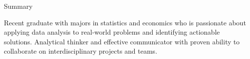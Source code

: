 \begin{rSection}{Summary}

Recent graduate with majors in statistics and economics who is passionate about applying data analysis to real-world problems and identifying actionable solutions. Analytical thinker and effective communicator with proven ability to collaborate on interdisciplinary projects and teams.



\end{rSection}

